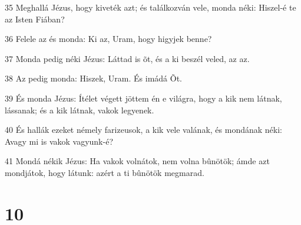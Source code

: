 \par 35 Meghallá Jézus, hogy kiveték azt; és találkozván vele, monda néki: Hiszel-é te az Isten Fiában?
\par 36 Felele az és monda: Ki az, Uram, hogy higyjek benne?
\par 37 Monda pedig néki Jézus: Láttad is õt, és a ki beszél veled, az az.
\par 38 Az pedig monda: Hiszek, Uram. És imádá Õt.
\par 39 És monda Jézus: Ítélet végett jöttem én e világra, hogy a kik nem látnak, lássanak; és a kik látnak, vakok legyenek.
\par 40 És hallák ezeket némely farizeusok, a kik vele valának, és mondának néki: Avagy mi is vakok vagyunk-é?
\par 41 Mondá nékik Jézus: Ha vakok volnátok, nem volna bûnötök; ámde azt mondjátok, hogy látunk: azért a ti bûnötök megmarad.

\chapter{10}

